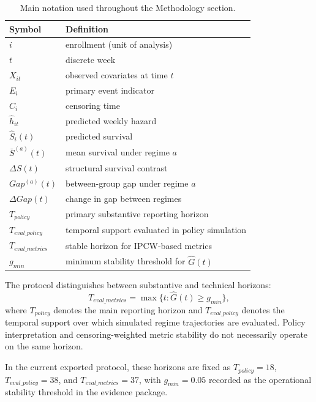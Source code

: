 \begin{table}[!t]
\centering
\footnotesize
\renewcommand{\arraystretch}{1.05}
\begin{tabular}{@{}p{} p{}@{}}
\hline
Symbol & Definition \\
\hline
$i$ & enrollment (unit of analysis) \\
$t$ & discrete week \\
$X_{it}$ & observed covariates at time $t$ \\
$E_i$ & primary event indicator \\
$C_i$ & censoring time \\
$\hat h_{it}$ & predicted weekly hazard \\
$\hat S_i(t)$ & predicted survival \\
$\bar S^{(a)}(t)$ & mean survival under regime $a$ \\
$\Delta S(t)$ & structural survival contrast \\
$Gap^{(a)}(t)$ & between-group gap under regime $a$ \\
$\Delta Gap(t)$ & change in gap between regimes \\
$T_{policy}$ & primary substantive reporting horizon \\
$T_{eval\_policy}$ & temporal support evaluated in policy simulation \\
$T_{eval\_metrics}$ & stable horizon for IPCW-based metrics \\
$g_{min}$ & minimum stability threshold for $\hat G(t)$ \\
\hline
\end{tabular}
\caption{Main notation used throughout the Methodology section.}
\label{tab:method_notation}
\end{table}

The protocol distinguishes between substantive and technical horizons:
\begin{equation*}
T_{eval\_metrics}=\max\{t:\hat G(t)\ge g_{min}\},
\end{equation*}
where $T_{policy}$ denotes the main reporting horizon and $T_{eval\_policy}$ denotes the temporal support over which simulated regime trajectories are evaluated. Policy interpretation and censoring-weighted metric stability do not necessarily operate on the same horizon.

In the current exported protocol, these horizons are fixed as $T_{policy}=18$, $T_{eval\_policy}=38$, and $T_{eval\_metrics}=37$, with $g_{min}=0.05$ recorded as the operational stability threshold in the evidence package.


